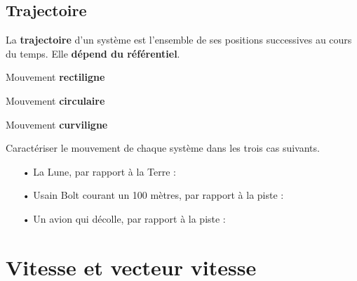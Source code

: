 \documentclass[12pt,a4paper]{article}
\begin{document}
\subsection{Trajectoire}

La \textbf{trajectoire} d'un système est l'ensemble de ses positions successives au cours du temps.
Elle \textbf{dépend du référentiel}.

\begin{multicols}{3}
\begin{center}
\textcolor{bleu_f}{Mouvement \textbf{rectiligne}}


\textcolor{green_f}{Mouvement \textbf{circulaire}}


\textcolor{red_f}{Mouvement \textbf{curviligne}}

\end{center}
\end{multicols}

\begin{em}
Caractériser le mouvement de chaque système dans les trois cas suivants.
\begin{itemize}
\item[•] La Lune, par rapport à la Terre :
\item[•] Usain Bolt courant un 100 mètres, par rapport à la piste :
\item[•] Un avion qui décolle, par rapport à la piste :
\end{itemize}
\end{em}

\section{Vitesse et vecteur vitesse}
\end{document}
